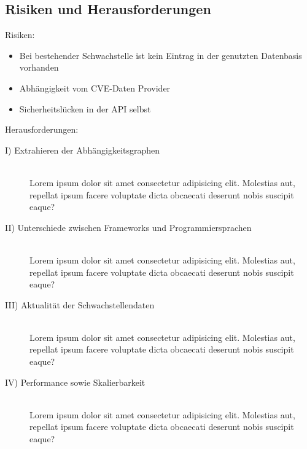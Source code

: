 \subsection{Risiken und Herausforderungen} \label{sec:Risiken und Herausforderungen}
    Risiken:
    \begin{itemize}
        \item Bei bestehender Schwachstelle ist kein Eintrag in der genutzten Datenbasis vorhanden
        \item Abhängigkeit vom CVE-Daten Provider
        \item Sicherheitslücken in der API selbst
    \end{itemize}
    Herausforderungen:
    \begin{description}
        \item[I) Extrahieren der Abhängigkeitsgraphen]\hfill \\
            Lorem ipsum dolor sit amet consectetur adipisicing elit. Molestias aut, repellat ipsum facere voluptate dicta obcaecati deserunt nobis suscipit eaque?
        \item[II) Unterschiede zwischen Frameworks und Programmiersprachen]\hfill \\
            Lorem ipsum dolor sit amet consectetur adipisicing elit. Molestias aut, repellat ipsum facere voluptate dicta obcaecati deserunt nobis suscipit eaque?
        \item[III) Aktualität der Schwachstellendaten]\hfill \\
            Lorem ipsum dolor sit amet consectetur adipisicing elit. Molestias aut, repellat ipsum facere voluptate dicta obcaecati deserunt nobis suscipit eaque?
        \item[IV) Performance sowie Skalierbarkeit]\hfill \\
            Lorem ipsum dolor sit amet consectetur adipisicing elit. Molestias aut, repellat ipsum facere voluptate dicta obcaecati deserunt nobis suscipit eaque?
    \end{description}

